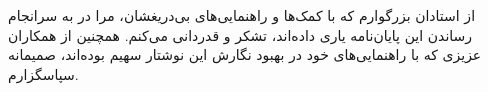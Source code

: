 


\begin{center}
\end{center}

از استادان بزرگوارم که با کمک‌ها و راهنمایی‌های بی‌دریغشان، مرا
در به سرانجام رساندن این پایان‌نامه یاری داده‌اند، تشکر و قدردانی می‌کنم.
همچنین از همکاران عزیزی که با راهنمایی‌های خود در بهبود نگارش این نوشتار
سهیم بوده‌اند، صمیمانه سپاسگزارم.

